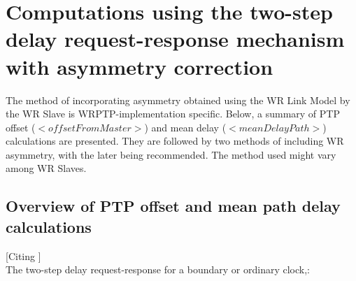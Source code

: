 \documentclass[a4paper, 12pt]{article}
\begin{document}
\section{Computations using the two-step delay request-response mechanism with asymmetry correction}
\label{ap:computationsExplanation}

The method of incorporating asymmetry obtained using the WR Link Model by the WR Slave 
is WRPTP-implementation specific. Below, a summary of PTP offset ($<offsetFromMaster>$) 
and mean delay ($<meanDelayPath>$) calculations are presented. They are followed by 
two methods of including WR asymmetry, with the later being recommended. 
The method used might vary among WR Slaves.

\subsection{Overview of PTP offset and mean path delay calculations}
\label{ap:ptpComputations}
[Citing \cite{IEEE1588}] \\
The two-step delay request-response for a boundary or ordinary clock,:
\end{document}
